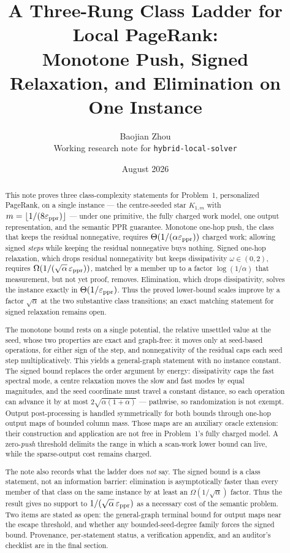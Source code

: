\documentclass[11pt]{article}
\title{A Three-Rung Class Ladder for Local PageRank:\\
Monotone Push, Signed Relaxation, and Elimination on One Instance}
\author{Baojian Zhou\\
\small Working research note for \texttt{hybrid-local-solver}}
\date{August 2026}
\begin{document}
\maketitle

\begin{abstract}
This note proves three class-complexity statements for Problem~1, personalized
PageRank, on a single instance --- the centre-seeded star $K_{1,m}$ with
$m=\left\lfloor 1/(8\varepsilon_{\mathrm{ppr}}) \right\rfloor$ --- under one primitive, the fully charged work
model, one output representation, and the semantic PPR guarantee. Monotone
one-hop push, the class that keeps the residual nonnegative, requires
$\Theta(1/(\alpha\varepsilon_{\mathrm{ppr}}))$ charged work;
allowing signed \emph{steps} while keeping the residual nonnegative buys
nothing. Signed one-hop relaxation, which drops residual nonnegativity but
keeps dissipativity $\omega\in(0,2)$, requires
$\Omega(1/(\sqrt\alpha\,\varepsilon_{\mathrm{ppr}}))$, matched by a member up to a factor
$\log(1/\alpha)$ that measurement, but not yet proof, removes. Elimination,
which drops dissipativity, solves the instance exactly in
$\Theta(1/\varepsilon_{\mathrm{ppr}})$. Thus the proved lower-bound scales improve by a factor
$\sqrt\alpha$ at the two substantive class transitions; an exact matching
statement for signed relaxation remains open.

The monotone bound rests on a single potential, the relative unsettled value
at the seed, whose two properties are exact and graph-free: it moves only at
seed-based operations, for either sign of the step, and nonnegativity of the
residual caps each seed step multiplicatively. This yields a general-graph
statement with no instance constant. The signed bound replaces the order
argument by energy: dissipativity caps the fast spectral mode, a centre
relaxation moves the slow and fast modes by equal magnitudes, and the seed
coordinate must travel a constant distance, so each operation can advance it
by at most $2\sqrt{\alpha(1+\alpha)}$ --- pathwise, so randomization is not
exempt. Output post-processing is handled symmetrically for both bounds
through one-hop output maps of bounded column mass. Those maps are an
auxiliary oracle extension: their construction and application are not free
in Problem~1's fully charged model. A zero-\emph{push} threshold delimits the
range in which a scan-work lower bound can live, while the sparse-output cost
remains charged.

The note also records what the ladder does \emph{not} say. The signed bound
is a class statement, not an information barrier: elimination is
asymptotically faster than every member of that class on the same instance by
at least an $\Omega(1/\sqrt\alpha)$ factor. Thus the result gives no support
to $1/(\sqrt\alpha\,\varepsilon_{\mathrm{ppr}})$ as a necessary cost of the semantic problem.
Two items are stated as open: the general-graph
terminal bound for output maps near the escape threshold, and whether any
bounded-seed-degree family forces the signed bound. Provenance, per-statement
status, a verification appendix, and an auditor's checklist are in the final
section.
\end{abstract}
\end{document}
